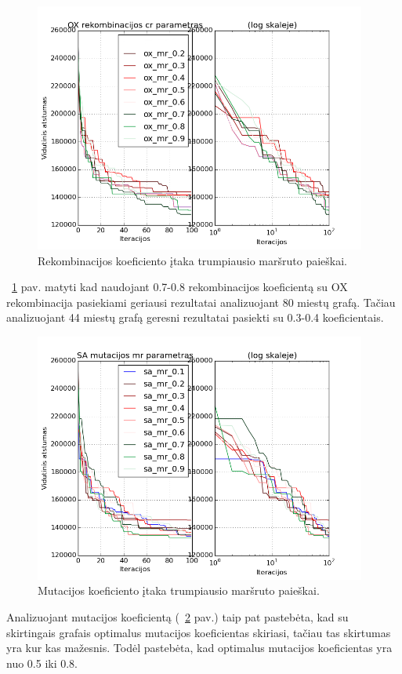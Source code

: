 \documentclass[runningheads,a4paper]{llncs}
\begin{document}
\begin{figure}
\centering
\includegraphics[height=8.2cm]{img/cros}
\caption{Rekombinacijos koeficiento įtaka trumpiausio maršruto paieškai.}
\label{fig:cros}
\end{figure}

~\ref{fig:cros} pav. matyti kad naudojant 0.7-0.8 rekombinacijos koeficientą su OX rekombinacija pasiekiami geriausi rezultatai analizuojant 80 miestų grafą. Tačiau analizuojant 44 miestų grafą geresni rezultatai pasiekti su 0.3-0.4 koeficientais.

\begin{figure}
\centering
\includegraphics[height=8.2cm]{img/mut}
\caption{Mutacijos koeficiento įtaka trumpiausio maršruto paieškai.}
\label{fig:mut}
\end{figure}

Analizuojant mutacijos koeficientą (~\ref{fig:mut} pav.) taip pat pastebėta, kad su skirtingais grafais optimalus mutacijos koeficientas skiriasi, tačiau tas skirtumas yra kur kas mažesnis. Todėl pastebėta, kad optimalus mutacijos koeficientas yra nuo 0.5 iki 0.8.
\end{document}

